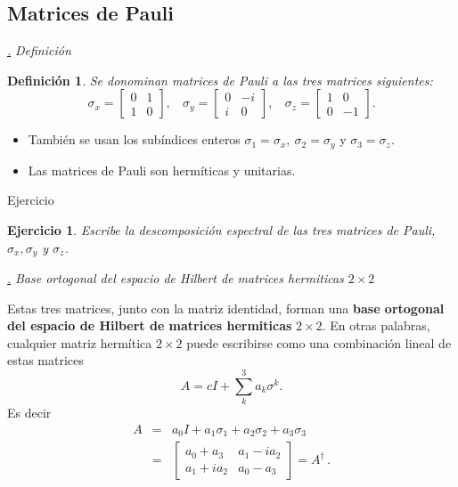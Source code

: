 \documentclass[a4paper,11pt]{book} %
\newtheorem{definicion_contador}{Definición}
\newcommand{\Definicion}[1]{
		\begin{mybox_gray2}{}
			\begin{definicion_contador}
				 #1 
			\end{definicion_contador} 
		\end{mybox_gray2}
	}
\newtheorem{ejercicio_contador}{Ejercicio}
\newcommand{\Ejercicio}[1]{
		\begin{mybox_gray}{Ejercicio} 
			\begin{ejercicio_contador}
				 #1 
			\end{ejercicio_contador} 
		\end{mybox_gray}
	}
\numberwithin{equation}{chapter}
\def\subsubiContadorIt{\par\addtocounter{subsubsection}{1}\underline{\it\thesubsubsection.}\hskip0.5cm \setcounter{subsubsubsectionIt}{0}}
\newcommand{\SubsubiIt}[1]{
		\subsubiContadorIt \textit{#1}
	}
\newcounter{subsubsubsectionIt}[subsubsection]
\begin{document}
		\subsection{Matrices de Pauli} \label{sec_qubit_matrices_Pauli}

			\SubsubiIt{Definición}

\Definicion{
Se donominan matrices de Pauli a las tres matrices siguientes:
	\begin{equation} \label{ec_qubits_matrices_de_Pauli}
	\sigma_x =  \begin{bmatrix} 0 & 1 \\ 1 & 0 \end{bmatrix} ,   ~~~~
	\sigma_y =  \begin{bmatrix} 0 & -i \\ i & 0 \end{bmatrix} ,  ~~~~
	\sigma_z =  \begin{bmatrix} 1 & 0 \\ 0 & -1 \end{bmatrix} .
	\end{equation}		
}

\begin{itemize}
	\item También se usan los subíndices enteros $\sigma_1=\sigma_x, ~
\sigma_2=\sigma_y$  y  $\sigma_3=\sigma_z$. 

	\item Las matrices de Pauli son hermíticas y unitarias.

\end{itemize}

	\Ejercicio{
	Escribe la descomposición espectral de las tres matrices de Pauli, $\sigma_x, \sigma_y $ y $\sigma_z$.
	}

			\SubsubiIt{Base ortogonal del espacio de Hilbert de matrices hermiticas $2\times2$}

Estas tres matrices, junto con la matriz identidad, forman una \textbf{base ortogonal del espacio de Hilbert de matrices hermiticas} $2\times2$. En otras palabras, cualquier matriz hermítica $2\times2$ puede escribirse como una combinación lineal de estas matrices
\begin{equation}
A = c I + \sum_k^3 a_k \sigma^k.
\end{equation}
Es decir
\begin{eqnarray*}
A &=&  a_0 I + a_1 \sigma_1 + a_2 \sigma_2 + a_3 \sigma_3  \\ 
  &=& 
	\begin{bmatrix}
	a_0 + a_3 & a_1 - i a_2 \\ a_1 + i a_2 & a_0 - a_3
	\end{bmatrix} = A^\dagger \,.
\end{eqnarray*}
\end{document}
